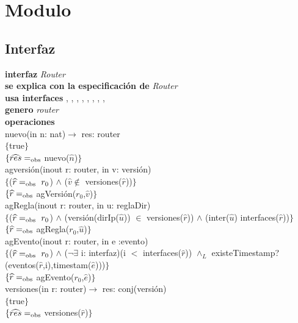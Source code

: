 \section*{Modulo }

\subsection*{Interfaz}
\textbf{interfaz} \textit{Router}\\
\textbf{se explica con la especificaci\'on de} \textit{Router}\\
\textbf{usa interfaces} , , , , , , , , \\
\textbf{genero} \textit{router}\\
\textbf{operaciones}\\

nuevo(in n: nat)$\rightarrow$ res: router\\
$\{$true$\}$\\
$\{\widehat{res} =_{\mathrm{obs}}$ nuevo($\widehat{n}$)$\}$\\

agversi\'on(inout r: router, in v: versi\'on)\\
$\{$($\widehat{r} =_{\mathrm{obs}}\ r_0$) $\wedge$ ($\widehat{v} \notin$ versiones($\widehat{r}$))$\}$\\
$\{\widehat{r} =_{\mathrm{obs}}$ agVersi\'on($r_0$,$\widehat{v}$)$\}$\\

agRegla(inout r: router, in u: reglaDir)\\
$\{$($\widehat{r} =_{\mathrm{obs}}\ r_0$) $\wedge$ (versi\'on(dirIp($\widehat{u}$)) $\in$ versiones($\widehat{r}$)) $\wedge$ (inter($\widehat{u}$) interfaces($\widehat{r}$))$\}$\\
$\{\widehat{r} =_{\mathrm{obs}}$ agRegla($r_0$,$\widehat{u}$)$\}$\\

agEvento(inout r: router, in e :evento)\\
$\{$($\widehat{r} =_{\mathrm{obs}}\ r_0$) $\wedge$ ($\neg \exists$ i: interfaz)(i $<$ interfaces($\widehat{r}$)) $\wedge_L$ existeTimestamp?(eventos($\widehat{r}$,i),timestam($\widehat{e}$)))$\}$\\
$\{\widehat{r}=_{\mathrm{obs}}$ agEvento($r_0$,$\widehat{e}$)$\}$\\

versiones(in r: router)$\longrightarrow$ res: conj(versi\'on)\\
$\{$true$\}$\\
$\{\widehat{res}=_{\mathrm{obs}}$ versiones($\widehat{r}$)$\}$\\

